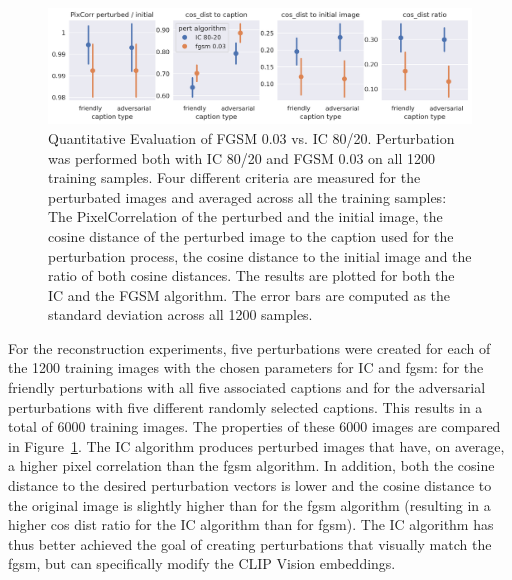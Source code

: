 
\begin{figure}[ht]
    \centering
    \includegraphics[width=1\textwidth]{plots/advpert_validation_chosen_perts.png}
    \caption[Quantitative Evaluation of FGSM 0.03 vs. IC 80/20]{Quantitative Evaluation of FGSM 0.03 vs. IC 80/20. Perturbation was performed both with IC 80/20 and FGSM 0.03 on all 1200 training samples. Four different criteria are measured for the perturbated images and averaged across all the training samples: The PixelCorrelation of the perturbed and the initial image, the cosine distance of the perturbed image to the caption used for the perturbation process, the cosine distance to the initial image and the ratio of both cosine distances. The results are plotted for both the IC and the FGSM algorithm. The error bars are computed as the standard deviation across all 1200 samples.}\label{fig:advpert_validation_chosen_perts} 
\end{figure}
    
For the reconstruction experiments, five perturbations were created for each of the 1200 training images with the chosen parameters for IC and fgsm: for the friendly perturbations with all five associated captions and for the adversarial perturbations with five different randomly selected captions. This results in a total of 6000 training images. The properties of these 6000 images are compared in Figure~\ref{fig:advpert_validation_chosen_perts}. The IC algorithm produces perturbed images that have, on average, a higher pixel correlation than the fgsm algorithm. In addition, both the cosine distance to the desired perturbation vectors is lower and the cosine distance to the original image is slightly higher than for the fgsm algorithm (resulting in a higher cos dist ratio for the IC algorithm than for fgsm). The IC algorithm has thus better achieved the goal of creating perturbations that visually match the fgsm, but can specifically modify the CLIP Vision embeddings.

